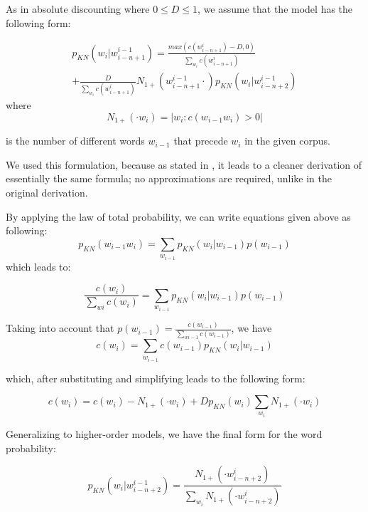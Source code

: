\documentclass[twoside]{article}
\begin{document}
\begin{multicols}{2}
As in absolute discounting where $0 \le D \le 1$, we assume that the model has the following form:

\begin{multline}
p_{KN}(w_{i} | w_{i-n+1}^{i-1}) = \frac{max(c(w_{i-n+1}^{i}) - D, 0)}{\sum_{w_{i}} c(w_{i-n+1}^{i})}  \\ + \frac{D}{\sum_{w_{i}} c(w_{i-n+1}^{i})} N_{1+}(w_{i-n+1}^{i-1} \cdot) p_{KN}(w_{i} | w_{i-n+2}^{i-1}) 
\end{multline}
where 
\begin{equation}
N_{1+}(\cdot w_{i}) = |{w_{i} : c(w_{i-1}w_{i}) > 0}|
\end{equation}

is the number of different words $w_{i-1}$ that precede $w_{i}$ in the given corpus.

We used this formulation, because as stated in \cite{1_chen1999empirical}, it leads to a cleaner derivation of essentially the same formula; no approximations are required, unlike in the original derivation.

By applying the law of total probability, we can write equations given above as following:
\begin{equation}
p_{KN}(w_{i-1}w_{i} ) = \sum_{w_{i-1}} p_{KN}(w_{i} | w_{i-1} )p(w_{i-1})
\end{equation}
which leads to:

\begin{equation}
\frac{c(w_{i})}{\sum_{w{i}} c(w_{i})} = \sum_{w_{i-1}} p_{KN}(w_{i} | w_{i-1} )p(w_{i-1})
\end{equation}

Taking into account that $p(w_{i-1}) =\frac{c(w_{i-1})}{\sum_{w{i-1}} c(w_{i-1})} $, we have
\begin{equation}
c(w_{i}) = \sum_{w_{i-1}} c(w_{i-1}) p_{KN}(w_{i} | w_{i-1})
\end{equation}

which, after substituting and simplifying leads to the following form:

\begin{equation}
c(w_{i}) = c(w_{i}) - N_{1+}(\cdot w_{i}) + D p_{KN}(w_{i}) \sum_{w_{i}} N_{1+}(\cdot w_{i})
\end{equation}

Generalizing to higher-order models, we have the final form for the word probability:

\begin{equation}
p_{KN}(w_{i} | w_{i-n+2}^{i-1}) = \frac{N_{1+}(\cdot w_{i-n+2}^{i})}{\sum_{w_{i}}N_{1+}(\cdot w_{i-n+2}^{i})} 
\end{equation}


\end{multicols}
\end{document}
